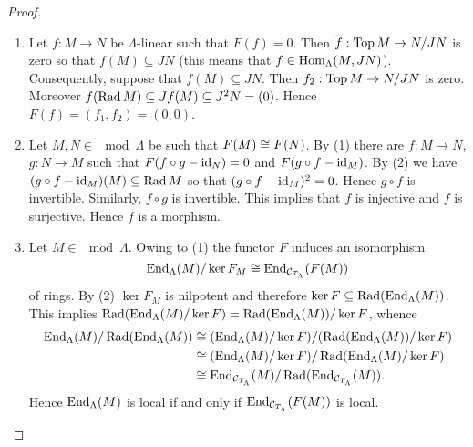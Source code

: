 \begin{proof}
\begin{enumerate}
 \item Let $f: M \to N$ be $\Lambda$-linear such that $F(f) = 0$. Then $\overline f:
 \operatorname{Top} M \to N/J N$ is zero so that $f(M) \subseteq J
 N$ (this means that $f \in \operatorname{Hom}_\Lambda(M, J N)$). Consequently, suppose that
 $f(M) \subseteq J N$. Then $f_2 : \operatorname{Top} M \to N/J N$
 is zero. Moreover $f(\operatorname{Rad} M) \subseteq J f(M) \subseteq J^2 N = (0)$. Hence
 $F(f) = (f_1, f_2) = (0, 0)$.

 \item Let $M, N \in \mod \Lambda$ be such that $F(M) \cong F(N)$. By (1) there are $f: M
 \to N$, $g : N \to M$ such that $F(f \circ g - \operatorname{id}_N) = 0$ and $F(g \circ f - \operatorname{id}_M)$.
 By (2) we have $(g \circ f - \operatorname{id}_M)(M) \subseteq \operatorname{Rad} M$ so that $(g \circ f - \operatorname{id}_M)^2 =
 0$. Hence $g \circ f$ is invertible. Similarly, $f \circ g$ is invertible. This implies that $f$ is
 injective and $f$ is surjective. Hence $f$ is a morphism.

 \item Let $M \in \mod \Lambda$. Owing to (1) the functor $F$ induces an isomorphism
 \[ \operatorname{End}_\Lambda(M)/\ker F_M \cong \operatorname{End}_{\mathcal{C}_{T_\Lambda}}(F(M)) \]
 of rings. By (2) $\ker F_M$ is nilpotent and therefore $\ker F \subseteq
 \operatorname{Rad}(\operatorname{End}_\Lambda(M))$. This implies $\operatorname{Rad}(\operatorname{End}_\Lambda(M)/\ker F) =
 \operatorname{Rad}(\operatorname{End}_\Lambda(M))/\ker F$, whence
 \begin{align*}
\operatorname{End}_\Lambda(M)/\operatorname{Rad}(\operatorname{End}_\Lambda(M))
&\cong (\operatorname{End}_\Lambda(M)/\ker F)/(\operatorname{Rad}(\operatorname{End}_\Lambda(M))/\ker F)\\
&\cong (\operatorname{End}_\Lambda(M)/\ker F)/\operatorname{Rad}(\operatorname{End}_\Lambda(M)/\ker F)\\
&\cong \operatorname{End}_{\mathcal{C}_{T_\Lambda}}(M)/\operatorname{Rad}(\operatorname{End}_{\mathcal{C}_{T_\Lambda}}(M)).
 \end{align*}
 Hence $\operatorname{End}_\Lambda(M)$ is local if and only if $\operatorname{End}_{\mathcal{C}_{T_\Lambda}}(F(M))$ is local.


\end{enumerate}
\end{proof}
